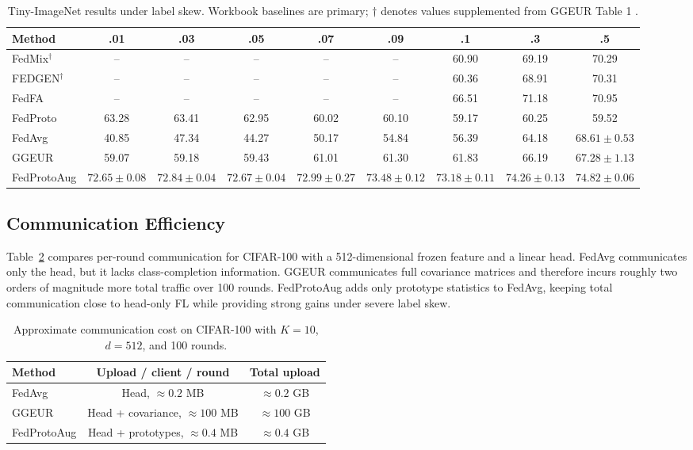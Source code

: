 ﻿\documentclass[conference]{IEEEtran}
\newcommand{\method}{FedProtoAug}
\begin{document}
\begin{table}[t]
\centering
\caption{Tiny-ImageNet results under label skew. Workbook baselines are primary; $\dagger$ denotes values supplemented from GGEUR Table 1 \cite{ma2025ggeur}.}
\label{tab:tiny}
\begin{tabular}{lcccccccc}
\toprule
Method & .01 & .03 & .05 & .07 & .09 & .1 & .3 & .5 \\
\midrule
FedMix$^\dagger$ & -- & -- & -- & -- & -- & 60.90 & 69.19 & 70.29 \\
FEDGEN$^\dagger$ & -- & -- & -- & -- & -- & 60.36 & 68.91 & 70.31 \\
FedFA & -- & -- & -- & -- & -- & 66.51 & 71.18 & 70.95 \\
FedProto & 63.28 & 63.41 & 62.95 & 60.02 & 60.10 & 59.17 & 60.25 & 59.52 \\
FedAvg & 40.85 & 47.34 & 44.27 & 50.17 & 54.84 & 56.39 & 64.18 & $68.61\pm0.53$ \\
GGEUR & 59.07 & 59.18 & 59.43 & 61.01 & 61.30 & 61.83 & 66.19 & $67.28\pm1.13$ \\
\method{} & $72.65\pm0.08$ & $72.84\pm0.04$ & $72.67\pm0.04$ & $72.99\pm0.27$ & $73.48\pm0.12$ & $73.18\pm0.11$ & $74.26\pm0.13$ & $74.82\pm0.06$ \\
\bottomrule
\end{tabular}
\end{table}

\subsection{Communication Efficiency}
Table~\ref{tab:comm} compares per-round communication for CIFAR-100 with a 512-dimensional frozen feature and a linear head. FedAvg communicates only the head, but it lacks class-completion information. GGEUR communicates full covariance matrices and therefore incurs roughly two orders of magnitude more total traffic over 100 rounds. \method{} adds only prototype statistics to FedAvg, keeping total communication close to head-only FL while providing strong gains under severe label skew.

\begin{table}[t]
\centering
\caption{Approximate communication cost on CIFAR-100 with $K=10$, $d=512$, and 100 rounds.}
\label{tab:comm}
\begin{tabular}{lcc}
\toprule
Method & Upload / client / round & Total upload \\
\midrule
FedAvg & Head, $\approx0.2$ MB & $\approx0.2$ GB \\
GGEUR & Head + covariance, $\approx100$ MB & $\approx100$ GB \\
\method{} & Head + prototypes, $\approx0.4$ MB & $\approx0.4$ GB \\
\bottomrule
\end{tabular}
\end{table}
\end{document}
